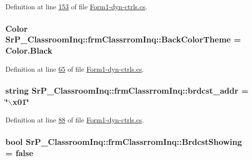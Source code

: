 \-Definition at line \hyperlink{_form1-dyn-ctrls_8cs_source_l00153}{153} of file \hyperlink{_form1-dyn-ctrls_8cs_source}{\-Form1-\/dyn-\/ctrls.\-cs}.

\hypertarget{class_sr_p___classroom_inq_1_1frm_classrrom_inq_a29b5dc6ea05e60bb2577a5bef3532d7b}{
\subsubsection[{\-Back\-Color\-Theme}]{\setlength{\rightskip}{0pt plus 5cm}\-Color {\bf \-Sr\-P\-\_\-\-Classroom\-Inq\-::frm\-Classrrom\-Inq\-::\-Back\-Color\-Theme} = \-Color.\-Black}}
\label{class_sr_p___classroom_inq_1_1frm_classrrom_inq_a29b5dc6ea05e60bb2577a5bef3532d7b}


\-Definition at line \hyperlink{_form1-dyn-ctrls_8cs_source_l00065}{65} of file \hyperlink{_form1-dyn-ctrls_8cs_source}{\-Form1-\/dyn-\/ctrls.\-cs}.

\hypertarget{class_sr_p___classroom_inq_1_1frm_classrrom_inq_a1d96e40e37aca536a94b7107df4a2d71}{
\subsubsection[{brdcst\-\_\-addr}]{\setlength{\rightskip}{0pt plus 5cm}string {\bf \-Sr\-P\-\_\-\-Classroom\-Inq\-::frm\-Classrrom\-Inq\-::brdcst\-\_\-addr} = \char`\"{}$\backslash$x01\char`\"{}}}
\label{class_sr_p___classroom_inq_1_1frm_classrrom_inq_a1d96e40e37aca536a94b7107df4a2d71}


\-Definition at line \hyperlink{_form1-dyn-ctrls_8cs_source_l00088}{88} of file \hyperlink{_form1-dyn-ctrls_8cs_source}{\-Form1-\/dyn-\/ctrls.\-cs}.

\hypertarget{class_sr_p___classroom_inq_1_1frm_classrrom_inq_a03327a44c502ac413d982a79dce5483c}{
\subsubsection[{\-Brdcst\-Showing}]{\setlength{\rightskip}{0pt plus 5cm}bool {\bf \-Sr\-P\-\_\-\-Classroom\-Inq\-::frm\-Classrrom\-Inq\-::\-Brdcst\-Showing} = false}}
\label{class_sr_p___classroom_inq_1_1frm_classrrom_inq_a03327a44c502ac413d982a79dce5483c}


